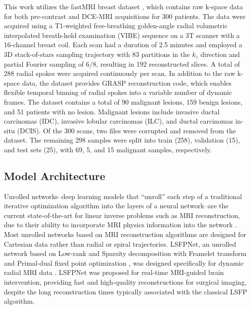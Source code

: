 \documentclass[runningheads]{llncs}
\begin{document}
This work utilizes the fastMRI breast dataset \cite{solomon2024fastmribreastpubliclyavailable}, which contains raw k-space data for both pre-contrast and DCE-MRI acquisitions for 300 patients. The data were acquired using a T1-weighted free-breathing golden-angle radial volumetric interpolated breath-hold examination (VIBE) sequence on a 3T scanner with a 16-channel breast coil. Each scan had a duration of 2.5 minutes and employed a 3D stack-of-stars sampling trajectory with 83 partitions in the $k_z$ direction and partial Fourier sampling of 6/8, resulting in 192 reconstructed slices. A total of 288 radial spokes were acquired continuously per scan. In addition to the raw k-space data, the dataset provides GRASP reconstruction code, which enables flexible temporal binning of radial spokes into a variable number of dynamic frames. The dataset contains a total of 90 malignant lesions, 159 benign lesions, and 51 patients with no lesion. Malignant lesions include invasive ductal carcinomas (IDC), invasive lobular carcinomas (ILC), and ductal carcinomas in-situ (DCIS). Of the 300 scans, two files were corrupted and removed from the dataset. The remaining 298 samples were split into train (258), validation (15), and test sets (25), with 69, 5, and 15 malignant samples, respectively.


\subsection{Model Architecture}

Unrolled networks--deep learning models that ``unroll'' each step of a traditional iterative optimization algorithm into the layers of a neural network--are the current state-of-the-art for linear inverse problems such as MRI reconstruction, due to their ability to incorporate MRI physics information into the network \cite{Hammernik2017Variational}. Most unrolled networks based on MRI reconstruction algorithms are designed for Cartesian data rather than radial or spiral trajectories. LSFPNet, an unrolled network based on Low-rank and Sparsity decomposition with Framelet transform and Primal-dual fixed point optimization \cite{9678015}, was designed specifically for dynamic radial MRI data \cite{He2023Unrolled}. LSFPNet was proposed for real-time MRI-guided brain intervention, providing fast and high-quality reconstructions for surgical imaging, despite the long reconstruction times typically associated with the classical LSFP algorithm. 
\end{document}
